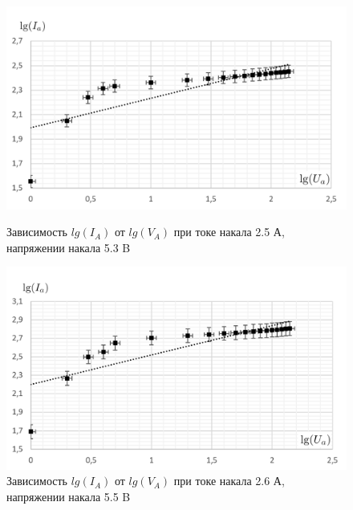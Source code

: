 \documentclass[a4paper]{article}
\begin{document}
\begin{figure}[h]
\begin{center}
\begin{minipage}[h]{0.45\linewidth}
\includegraphics[width=1\linewidth]{2_5.png}
\caption{Зависимость $lg(I_A)$ от $lg(V_A)$ при токе накала 2.5 А, напряжении накала 5.3 B}
\end{minipage}
\hfill 
\begin{minipage}[h]{0.45\linewidth}
\includegraphics[width=1\linewidth]{2_6.png}
\caption{Зависимость $lg(I_A)$ от $lg(V_A)$ при токе накала 2.6 А, напряжении накала 5.5 B }
\end{minipage}
\end{center}
\end{figure}
\end{document}
